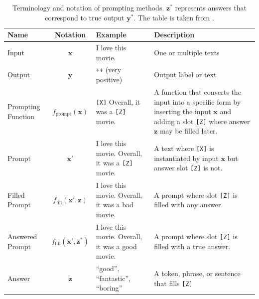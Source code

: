 \begin{table}[!t]
\centering
\footnotesize
\renewcommand{\arraystretch}{1.2}
\begin{tabular}{m{1.8cm}cm{4.8cm}m{6.6cm}}

\toprule
\textbf{Name} & \textbf{Notation} & \textbf{Example} & \textbf{Description} \\ 
\midrule
Input & $\bm{x}$ & I love this movie. & One or multiple texts \\
Output  & $\bm{y}$   & \texttt{++} (very positive) &  Output label or text   \\
\midrule
Prompting Function  & $f_{\text{prompt}}(\bm{x})$ & \texttt{[X]} Overall, it was a \texttt{[Z]} movie.                      & A function that converts the input into a specific form by inserting the input $\bm{x}$ and adding a slot \texttt{[Z]} where answer $\bm{z}$ may be filled later.
\\
\midrule
Prompt   & $\bm{x}'$       & I  love  this  movie.    Overall,  it  was  a \texttt{[Z]} movie. & A text where \texttt{[X]} is instantiated by input $\bm{x}$ but answer slot \texttt{[Z]} is not. \\
Filled Prompt     &  $f_{\text{fill}}(\bm{x'}, \bm{z})$      & I  love  this  movie.    Overall,  it  was  a bad movie. & A prompt where slot \texttt{[Z]} is filled with any answer. \\
Answered Prompt    & $f_{\text{fill}}(\bm{x'}, \bm{z}^{*})$       & I  love  this  movie. Overall, it was a good movie. & A prompt where slot \texttt{[Z]} is filled with a true answer. 
\\
\midrule
Answer    & $\bm{z}$   & ``good'', ``fantastic'', ``boring''    & A token,  phrase, or sentence that fills \texttt{[Z]} \\
\bottomrule
\end{tabular}
\caption{\label{tab:prompt} Terminology and notation of prompting methods. $\bm{z}^*$ represents answers that correspond to true output $\bm{y}^*$. The table is taken from \cite{liu2023pre}.
}
\end{table}